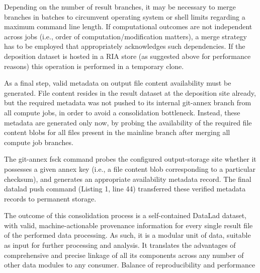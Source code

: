 
Depending on the number of result branches, it may be necessary to merge branches in batches to circumvent operating system or shell limits regarding a maximum command line length. If computational outcomes are not independent across jobs (i.e., order of computation/modification matters), a merge strategy has to be employed that appropriately acknowledges such dependencies. If the deposition dataset is hosted in a RIA store (as suggested above for performance reasons) this operation is performed in a temporary clone.

As a final step, valid metadata on output file content availability must be generated. File content resides in the result dataset at the deposition site already, but the required metadata was not pushed to its internal git-annex branch from all compute jobs, in order to avoid a consolidation bottleneck. Instead, these metadata are generated only now, by probing the availability of the required file content blobs for all files present in the mainline branch after merging all compute job branches.

The git-annex fsck command probes the configured output-storage site whether it possesses a given annex key (i.e., a file content blob corresponding to a particular checksum), and generates an appropriate availability metadata record. The final datalad push command (Listing 1, line 44) transferred these verified metadata records to permanent storage.

The outcome of this consolidation process is a self-contained DataLad dataset, with valid, machine-actionable provenance information for every single result file of the performed data processing. As such, it is a modular unit of data, suitable as input for further processing and analysis. It translates the advantages of comprehensive and precise linkage of all its components across any number of other data modules to any consumer.
Balance of reproducibility and performance

